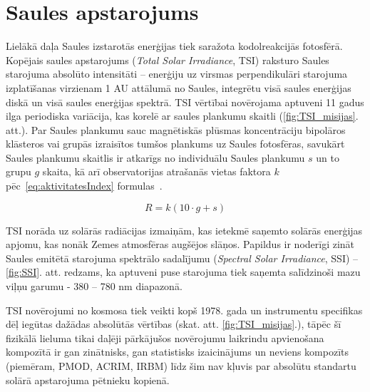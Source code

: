 \section{Saules apstarojums}

Lielākā daļa Saules izstarotās enerģijas tiek saražota kodolreakcijās fotosfērā. 
Kopējais saules apstarojums (\textit{Total Solar Irradiance}, TSI) raksturo Saules starojuma absolūto intensitāti -- enerģiju uz virsmas perpendikulāri starojuma izplatīšanas virzienam 1 AU attālumā no Saules, integrētu visā saules enerģijas diskā un visā saules enerģijas spektrā. TSI vērtībai novērojama aptuveni 11 gadus ilga periodiska variācija, kas korelē ar saules plankumu skaitli (\ref{fig:TSI_misijas}. att.). Par Saules plankumu sauc magnētiskās plūsmas koncentrāciju bipolāros klāsteros vai grupās izraisītos tumšos plankums uz Saules fotosfēras, savukārt Saules plankumu skaitlis ir atkarīgs no individuālu Saules plankumu $s$ un to grupu $g$ skaita, kā arī observatorijas atrašanās vietas faktora $k$
pēc~\ref{eq:aktivitatesIndex} formulas~\cite{ThermalProcesses}.

\begin{equation}
\label{eq:aktivitatesIndex}
R = k(10 \cdot g + s)
\end{equation}

TSI norāda uz solārās radiācijas izmaiņām, kas ietekmē saņemto solārās enerģijas apjomu, kas nonāk Zemes atmosfēras augšējos slāņos. Papildus ir noderīgi zināt Saules emitētā starojuma spektrālo sadalījumu (\textit{Spectral Solar Irradiance}, SSI) -- \ref{fig:SSI}. att. redzams, ka aptuveni puse starojuma tiek saņemta salīdzinoši mazu viļņu garumu - 380 -- 780 nm diapazonā.

TSI novērojumi no kosmosa tiek veikti kopš 1978. gada un instrumentu specifikas dēļ iegūtas dažādas absolūtās vērtības (skat. att. \ref{fig:TSI_misijas}.), tāpēc šī fizikālā lieluma tikai daļēji pārkājušos novērojumu laikrindu apvienošana kompozītā ir gan zinātnisks, gan statistisks izaicinājums un neviens kompozīts (piemēram, PMOD, ACRIM, IRBM) līdz šim nav kļuvis par absolūtu standartu solārā apstarojuma pētnieku kopienā.

